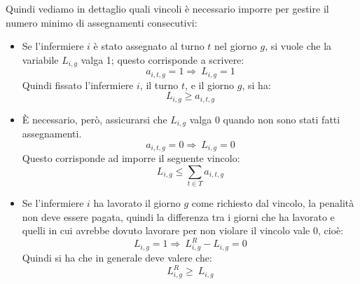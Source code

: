 Quindi vediamo in dettaglio quali vincoli è necessario imporre per gestire il numero minimo di assegnamenti consecutivi:
\begin{itemize}

\item Se l'infermiere $i$ è stato assegnato al turno $t$ nel giorno $g$, si vuole che la variabile $L_{i, g}$ valga 1; questo corrisponde a scrivere:
\begin{equation}
a_{i, t, g} = 1 \Longrightarrow\ L_{i, g} = 1
\end{equation}
Quindi fissato l'infermiere $i$, il turno $t$, e il giorno $g$, si ha:
\begin{equation}
L_{i, g} \geq a_{i, t, g}
\end{equation}


\item È necessario, però, assicurarsi che $L_{i, g}$ valga 0 quando non sono stati fatti assegnamenti.
\begin{equation}
a_{i, t, g} = 0 \Longrightarrow\ L_{i, g} = 0
\end{equation}
Questo corrisponde ad imporre il seguente vincolo:
\begin{equation}
L_{i, g} \leq \sum_{t \in T} a_{i, t, g} 
\end{equation}


\item Se l'infermiere $i$ ha lavorato il giorno $g$ come richiesto dal vincolo, la penalità non deve essere pagata, quindi la differenza tra i giorni che ha lavorato e quelli in cui avrebbe dovuto lavorare per non violare il vincolo vale 0, cioè:
\begin{equation}
L_{i, g} = 1 \Longrightarrow\ L_{i, g}^R - L_{i, g} = 0
\end{equation}
Quindi si ha che in generale deve valere che:
\begin{equation}
L_{i, g}^R \geq ~ L_{i, g}
\end{equation}


\end{itemize}
